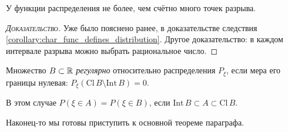 \documentclass[../main.tex]{subfiles}
\begin{document}
\begin{prop}
 У функции распределения не более, чем счётно много точек разрыва.
\end{prop}
\begin{proof}[\normalfont\textsc{Доказательство}]
 Уже было пояснено ранее, в доказательстве следствия \ref{corollary:char_func_defines_distribution}. Другое доказательство: в каждом интервале разрыва можно выбрать рациональное число.
\end{proof}

\begin{df}
 Множество $ B \subset \mathbb{R} $ \textit{регулярно} относительно распределения $ P_\xi $, если мера его границы нулевая: $ P_\xi(\mathrm{Cl}\,B \setminus \mathrm{Int}\,B) = 0 $.

 В этом случае $ P(\xi \in A) = P(\xi \in B) $, если $ \mathrm{Int}\,B \subset A \subset \mathrm{Cl}\,B $.

\end{df}

Наконец-то мы готовы приступить к основной теореме параграфа.
\end{document}
